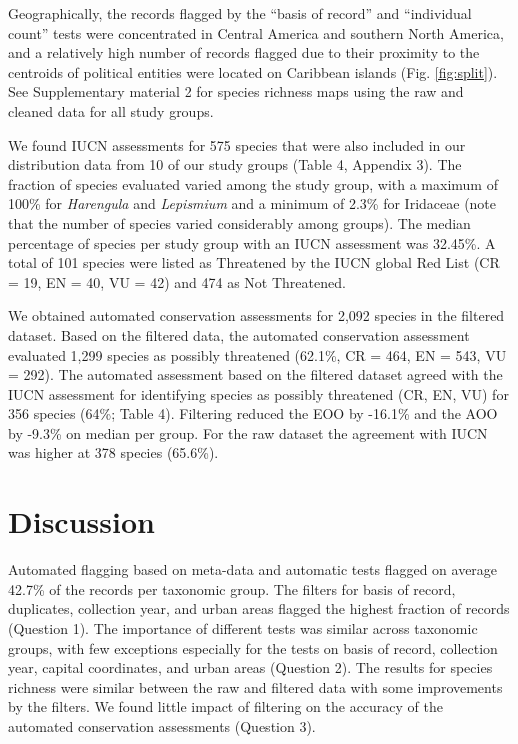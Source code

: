 \documentclass[fleqn,10pt,lineno]{wlpeerj} %
\begin{document}
Geographically, the records flagged by the ``basis of record'' and ``individual count'' tests were concentrated in Central America and southern North America, and a relatively high number of records flagged due to their proximity to the centroids of political entities were located on Caribbean islands (Fig. \ref{fig:split}). See Supplementary material 2 for species richness maps using the raw and cleaned data for all study groups.

We found IUCN assessments for 575 species that were also included in our distribution data from 10 of our study groups (Table 4, Appendix 3). The fraction of species evaluated varied among the study group, with a maximum of 100\% for \emph{Harengula} and \emph{Lepismium} and a minimum of 2.3\% for Iridaceae (note that the number of species varied considerably among groups). The median percentage of species per study group with an IUCN assessment was 32.45\%. A total of 101 species were listed as Threatened by the IUCN global Red List (CR = 19, EN = 40, VU = 42) and 474 as Not Threatened.

We obtained automated conservation assessments for 2,092 species in the filtered dataset. Based on the filtered data, the automated conservation assessment evaluated 1,299 species as possibly threatened (62.1\%, CR = 464, EN = 543, VU = 292). The automated assessment based on the filtered dataset agreed with the IUCN assessment for identifying species as possibly threatened (CR, EN, VU) for 356 species (64\%; Table 4). Filtering reduced the EOO by -16.1\% and the AOO by -9.3\% on median per group. For the raw dataset the agreement with IUCN was higher at 378 species (65.6\%).

\hypertarget{discussion}{%
\section*{Discussion}\label{discussion}}

Automated flagging based on meta-data and automatic tests flagged on average 42.7\% of the records per taxonomic group. The filters for basis of record, duplicates, collection year, and urban areas flagged the highest fraction of records (Question 1). The importance of different tests was similar across taxonomic groups, with few exceptions especially for the tests on basis of record, collection year, capital coordinates, and urban areas (Question 2). The results for species richness were similar between the raw and filtered data with some improvements by the filters. We found little impact of filtering on the accuracy of the automated conservation assessments (Question 3).
\end{document}
